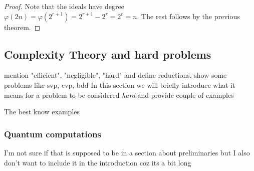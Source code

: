 \begin{proof}
    Note that the ideals have degree $\varphi(2n) = \varphi(2^{r+1}) = 2^{r+1} - 2^r = 2^r = n$. The rest follows by the previous theorem.
\end{proof}
\fi




\subsection{Complexity Theory and hard problems} 
\label{hardness}
mention "efficient", "negligible", "hard" and define reductions. show some problems like svp, cvp, bdd
In this section we will briefly introduce what it means for a problem to be considered \textit{hard} and provide couple of examples

The best know examples
\subsubsection*{Quantum computations}

I'm not sure if that is supposed to be in a section about preliminaries but I also don't want to include it in the introduction coz its a bit long

